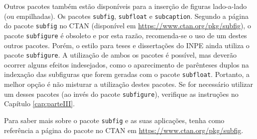 Outros pacotes também estão disponíveis para a inserção de figuras lado-a-lado (ou empilhadas). Os pacotes {\tt subfig}, {\tt subfloat} e {\tt subcaption}. Segundo a página do pacote {\tt subfig} no CTAN (disponível em \url{https://www.ctan.org/pkg/subfig}), o pacote {\tt subfigure} é obsoleto e por esta razão, recomenda-se o uso de um destes outros pacotes. Porém, o estilo para teses e dissertações do INPE ainda utiliza o pacote {\tt subfigure}. A utilização de ambos os pacotes é possível, mas deverão ocorrer alguns efeitos indesejados, como o aparecimento de parênteses duplos na indexação das subfiguras que forem geradas com o pacote {\tt subfloat}. Portanto, a melhor opção é não misturar a utilização destes pacotes. Se for necessário utilizar um desses pacotes (ao invés do pacote {\tt subfigure}), verifique as instruções no Capítulo \ref{cap:parteIII}. 



\begin{marker}
Para saber mais sobre o pacote {\tt subfig} e as suas aplicações, tenha como referência a página do pacote no CTAN em \url{https://www.ctan.org/pkg/subfig}.
\end{marker}


